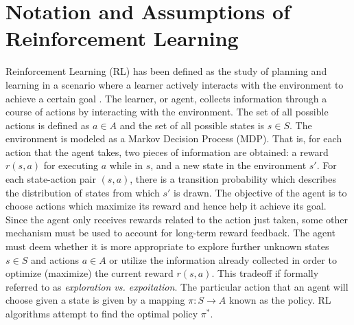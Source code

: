 \documentclass{article} %
\begin{document}
\section{Notation and Assumptions of Reinforcement Learning}

Reinforcement Learning (RL) has been defined as the study of planning and learning in a scenario where a learner actively interacts with the environment to achieve a certain goal \cite{mohri}. The learner, or agent, collects information through a course of actions by interacting with the environment.  The set of all possible actions is defined as $a \in A$ and the set of all possible states is $s \in S$. The environment is modeled as a Markov Decision Process (MDP).  That is, for each action that the agent takes, two pieces of information are obtained: a reward $r(s,a)$ for executing $a$ while in $s$, and a new state in the environment $s'$.  For each state-action pair $(s,a)$, there is a transition probability which describes the distribution of states from which $s'$ is drawn.  The objective of the agent is to choose actions which maximize its reward and hence help it achieve its goal.  Since the agent only receives rewards related to the action just taken, some other mechanism must be used to account for long-term reward feedback.
The agent must deem whether it is more appropriate to explore further unknown states $s \in S$ and actions $a \in A$ or utilize the information already collected in order to optimize (maximize) the current reward $r(s,a)$. This tradeoff if formally referred to as \textit{exploration vs. expoitation}. The particular action that an agent will choose given a state is given by a mapping $\pi : S \rightarrow A$ known as the policy. RL algorithms attempt to find the optimal policy $\pi^*$.
\end{document}
